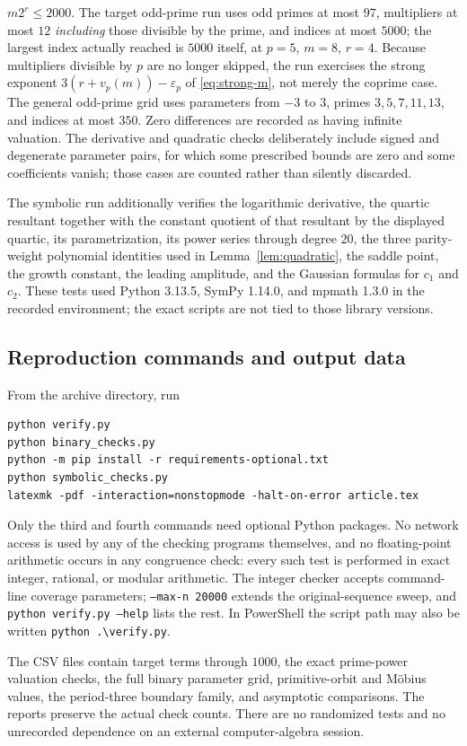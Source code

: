 \documentclass[11pt,a4paper]{article}
\numberwithin{equation}{section}
\theoremstyle{definition}
\theoremstyle{remark}
\newcommand{\eps}{\varepsilon}
\begin{document}
$m2^r\le2000$. The target odd-prime run uses odd primes at most $97$,
multipliers at most $12$ \emph{including} those divisible by the prime, and
indices at most $5000$; the largest index actually reached is $5000$ itself,
at $p=5$, $m=8$, $r=4$. Because
multipliers divisible by $p$ are no longer skipped, the run exercises the
strong exponent $3(r+v_p(m))-\eps_p$ of \eqref{eq:strong-m}, not merely the
coprime case. The general odd-prime grid uses parameters from $-3$ to $3$,
primes $3,5,7,11,13$, and indices at most $350$. Zero differences are
recorded as having infinite valuation. The derivative and quadratic checks
deliberately include signed and degenerate parameter pairs, for which some
prescribed bounds are zero and some coefficients vanish; those cases are
counted rather than silently discarded.

The symbolic run additionally verifies the logarithmic derivative, the
quartic resultant together with the constant quotient of that resultant by
the displayed quartic, its parametrization, its power series through degree
$20$, the three parity-weight polynomial identities used in
Lemma~\ref{lem:quadratic}, the saddle point, the growth constant, the leading
amplitude, and the Gaussian formulas for $c_1$ and $c_2$. These tests used
Python 3.13.5, SymPy 1.14.0, and mpmath 1.3.0 in the recorded environment;
the exact scripts are not tied to those library versions.

\subsection{Reproduction commands and output data}
From the archive directory, run
\begin{lstlisting}
python verify.py
python binary_checks.py
python -m pip install -r requirements-optional.txt
python symbolic_checks.py
latexmk -pdf -interaction=nonstopmode -halt-on-error article.tex
\end{lstlisting}
Only the third and fourth commands need optional Python packages. No network
access is used by any of the checking programs themselves, and no
floating-point arithmetic occurs in any congruence check: every such test is
performed in exact integer, rational, or modular arithmetic. The integer
checker accepts command-line coverage parameters; \texttt{--max-n 20000}
extends the original-sequence sweep, and \texttt{python verify.py --help}
lists the rest. In PowerShell the script path may also be written
\texttt{python .\textbackslash verify.py}.

The CSV files contain target terms through $1000$, the exact prime-power
valuation checks, the full binary parameter grid, primitive-orbit and
M\"obius values, the period-three boundary family, and asymptotic
comparisons. The reports preserve the actual check counts. There are no
randomized tests and no unrecorded dependence on an external computer-algebra
session.
\end{document}
